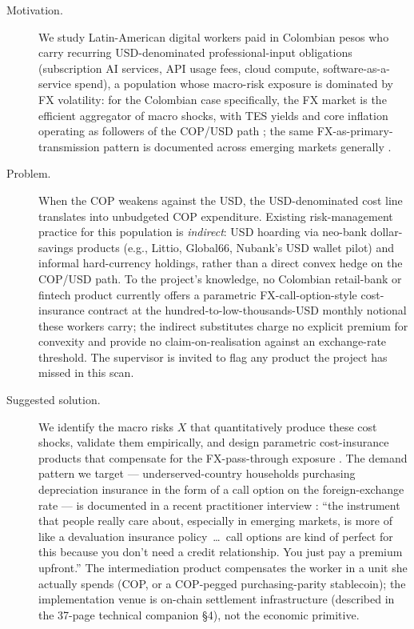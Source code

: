 \begin{description}
  \item[Motivation.] We study Latin-American digital workers paid in Colombian pesos who carry recurring USD-denominated professional-input obligations (subscription AI services, API usage fees, cloud compute, software-as-a-service spend), a population whose macro-risk exposure is dominated by FX volatility: for the Colombian case specifically, the FX market is the efficient aggregator of macro shocks, with TES yields and core inflation operating as followers of the COP/USD path \citep{rincontorresInterdependenceFXTreasury2021,rincontorresLowFrequencyEffectMacroNews2023,rinconcastroTraspasoTasaCambio2021,fuentesIntradayExchangeRate2014}; the same FX-as-primary-transmission pattern is documented across emerging markets generally \citep{calvo_reinhart_2002,rey_2015,bruno_shin_2015}.
  \item[Problem.] When the COP weakens against the USD, the USD-denominated cost line translates into unbudgeted COP expenditure. Existing risk-management practice for this population is \emph{indirect}: USD hoarding via neo-bank dollar-savings products (e.g., Littio, Global66, Nubank's USD wallet pilot) and informal hard-currency holdings, rather than a direct convex hedge on the COP/USD path. To the project's knowledge, no Colombian retail-bank or fintech product currently offers a parametric FX-call-option-style cost-insurance contract at the hundred-to-low-thousands-USD monthly notional these workers carry; the indirect substitutes charge no explicit premium for convexity and provide no claim-on-realisation against an exchange-rate threshold. The supervisor is invited to flag any product the project has missed in this scan.
  \item[Suggested solution.] We identify the macro risks \(X\) that quantitatively produce these cost shocks, validate them empirically, and design parametric cost-insurance products that compensate for the FX-pass-through exposure \citep{carter_etal_2017,mahul_stutley_2010,clarke_2016}. The demand pattern we target --- underserved-country households purchasing depreciation insurance in the form of a call option on the foreign-exchange rate --- is documented in a recent practitioner interview \citep{depreciation_insurance_talk}: ``the instrument that people really care about, especially in emerging markets, is more of like a devaluation insurance policy~\ldots~call options are kind of perfect for this because you don't need a credit relationship. You just pay a premium upfront.'' The intermediation product compensates the worker in a unit she actually spends (COP, or a COP-pegged purchasing-parity stablecoin); the implementation venue is on-chain settlement infrastructure (described in the 37-page technical companion \S4), not the economic primitive.

\end{description}
